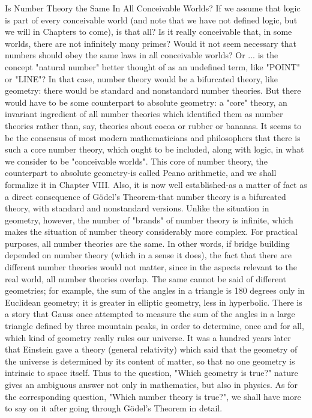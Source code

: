 Is Number Theory the Same In All Conceivable Worlds? If we assume that logic is part of every conceivable world (and note that we have not defined logic, but we will in Chapters to come), is that all? Is it really conceivable that, in some worlds, there are not infinitely many primes? Would it not seem necessary that numbers should obey the same laws in all conceivable worlds? Or ... is the concept "natural number" better thought of as an undefined term, like "POINT" or "LINE"? In that case, number theory would be a bifurcated theory, like geometry: there would be standard and nonstandard number theories. But there would have to be some counterpart to absolute geometry: a "core" theory, an invariant ingredient of all number theories which identified them as number theories rather than, say, theories about cocoa or rubber or bananas. It seems to be the consensus of most modern mathematicians and philosophers that there is such a core number theory, which ought to be included, along with logic, in what we consider to be "conceivable worlds". This core of number theory, the counterpart to absolute geometry-is called Peano arithmetic, and we shall formalize it in Chapter VIII. Also, it is now well established-as a matter of fact as a direct consequence of Gödel’s Theorem-that number theory is a bifurcated theory, with standard and nonstandard versions. Unlike the situation in geometry, however, the number of "brands" of number theory is infinite, which makes the situation of number theory considerably more complex. For practical purposes, all number theories are the same. In other words, if bridge building depended on number theory (which in a sense it does), the fact that there are different number theories would not matter, since in the aspects relevant to the real world, all number theories overlap. The same cannot be said of different geometries; for example, the sum of the angles in a triangle is 180 degrees only in Euclidean geometry; it is greater in elliptic geometry, less in hyperbolic. There is a story that Gauss once attempted to measure the sum of the angles in a large triangle defined by three mountain peaks, in order to determine, once and for all, which kind of geometry really rules our universe. It was a hundred years later that Einstein gave a theory (general relativity) which said that the geometry of the universe is determined by its content of matter, so that no one geometry is intrinsic to space itself. Thus to the question, "Which geometry is true?" nature gives an ambiguous answer not only in mathematics, but also in physics. As for the corresponding question, "Which number theory is true?", we shall have more to say on it after going through Gödel’s Theorem in detail. 

